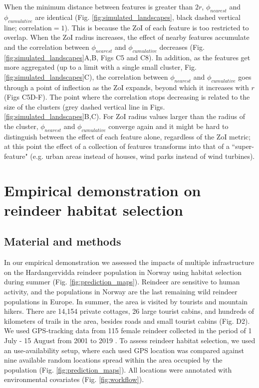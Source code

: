 \documentclass[titlepage]{article}
\begin{document}
When the minimum distance between features is greater than $2r$, $\phi_{nearest}$ and $\phi_{cumulative}$ are identical (Fig. \ref{fig:simulated_landscapes}, black dashed vertical line; $\text{correlation} = 1$). This is because the ZoI of each feature is too restricted to overlap. When the ZoI radius increases, the effect of nearby features accumulate and the correlation between $\phi_{nearest}$ and $\phi_{cumulative}$ decreases (Fig. \ref{fig:simulated_landscapes}A,B, Figs C5 and C8). In addition, as the features get more aggregated (up to a limit with a single small cluster, Fig. \ref{fig:simulated_landscapes}C), the correlation between $\phi_{nearest}$ and $\phi_{cumulative}$ goes through a point of inflection as the ZoI expands, beyond which it increases with $r$ (Figs C5D-F). The point where the correlation stops decreasing is related to the size of the clusters (grey dashed vertical line in Figs. \ref{fig:simulated_landscapes}B,C). For ZoI radius values larger than the radius of the cluster, $\phi_{nearest}$ and $\phi_{cumulative}$ converge again 
and it might be hard to distinguish between the effect of each feature alone, regardless of the ZoI metric; at this point the effect of a collection of features transforms into that of a ``super-feature" (e.g. urban areas instead of houses, wind parks instead of wind turbines). 

\section{Empirical demonstration on reindeer habitat selection}

\subsection{Material and methods}

In our empirical demonstration we assessed the impacts of multiple infrastructure on the Hardangervidda reindeer population in Norway using habitat selection during summer (Fig. \ref{fig:prediction_maps}). Reindeer are sensitive to human activity, and the populations in Norway are the last remaining wild reindeer populations in Europe. In summer, the area is visited by tourists and mountain hikers. There are 14,154 private cottages, 26 large tourist cabins, and hundreds of kilometers of trails in the area, besides roads and small tourist cabins (Fig. D2). We used GPS-tracking data from 115 female reindeer collected in the period of 1 July - 15 August from 2001 to 2019 \citep[see][for further details]{panzacchi_searching_2015}. To assess reindeer habitat selection, we used an use-availability setup, where each used GPS location was compared against nine available random locations spread within the area occupied by the population (Fig. \ref{fig:prediction_maps}). All locations were annotated with environmental covariates (Fig. \ref{fig:workflow}).
\end{document}
